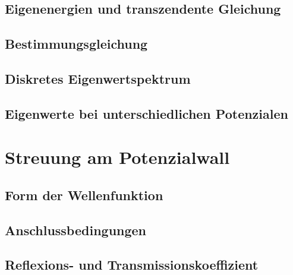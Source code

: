 \subsection{Eigenenergien und transzendente Gleichung}

\subsection{Bestimmungsgleichung}

\subsection{Diskretes Eigenwertspektrum}

\subsection{Eigenwerte bei unterschiedlichen Potenzialen}

\section{Streuung am Potenzialwall}

\subsection{Form der Wellenfunktion}

\subsection{Anschlussbedingungen}

\subsection{Reflexions- und Transmissionskoeffizient}


